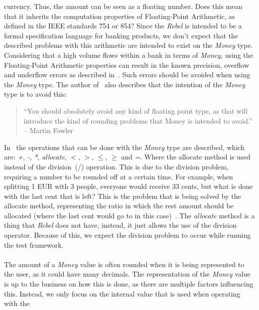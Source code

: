 currency. Thus, the amount can be seen as a floating number. Does this mean that
it inherits the computation properties of Floating-Point Arithmetic, as defined
in the IEEE standards 754 or 854? Since the \textit{Rebel} is intended to be a
formal specification language for banking products, we don't expect that the
described problems with this arithmetic are intended to exist on the
\textit{Money} type. Considering that a high volume flows within a bank in terms
of \textit{Money}, using the Floating-Point Arithmetic properties can result in
the known precision, overflow and underflow errors as described
in~\cite{goldberg1991every}. Such errors should be avoided when using the
\textit{Money} type. The author of~\cite{fowler2002patterns} also describes that
the intention of the \textit{Money} type is to avoid this:
\begin{quote}
	``You should absolutely avoid any kind of floating point type, as that will
	introduce the kind of rounding problems that Money is intended to avoid.''
    -- Martin Fowler~\cite{fowler2002patterns}
\end{quote}
%
In~\cite{fowler2002patterns} the operations that can be done with the
\textit{Money} type are described, which are: \textit{+}, \textit{-},
\textit{*}, \textit{allocate}, \textit{$<$}, \textit{$>$}, \textit{$\leq$},
\textit{$\geq$} and \textit{=}. Where the allocate method is used instead of the
division~(/) operation. This is due to the division problem, requiring a number
to be rounded off at a certain time. For example, when splitting 1 EUR with 3
people, everyone would receive 33 cents, but what is done with the last cent
that is left? This is the problem that is being solved by the allocate method,
representing the ratio in which the rest amount should be allocated (where the last
cent would go to in this case)~\cite{fowler2002patterns}. The \textit{allocate}
method is a thing that \textit{Rebel} does not have, instead, it just allows the
use of the division operator. Because of this, we expect the division problem to
occur while running the test framework.\\
\\
The amount of a \textit{Money} value is
often rounded when it is being represented to the user, as it could have many
decimals. The representation of the \textit{Money} value is up to the business
on how this is done, as there are multiple factors influencing this. Instead, we
only focus on the internal value that is used when operating with the
